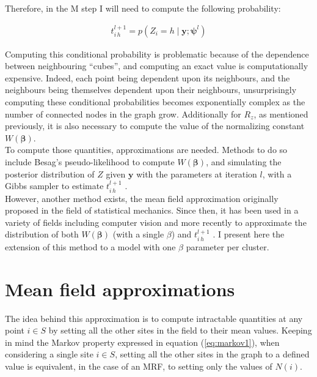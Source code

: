 Therefore, in the M step I will need to compute the following probability:

\begin{align*}
t_{i\,h}^{l+1} = p(Z_i = h \mid \boldsymbol{y};\boldsymbol{\psi}^{l})
\end{align*}

Computing this conditional probability is problematic because of the dependence between neighbouring ``cubes'', and computing an exact value is computationally expensive. Indeed, each point being dependent upon its neighbours, and the neighbours being themselves dependent upon their neighbours, unsurprisingly computing these conditional probabilities becomes exponentially complex as the number of connected nodes in the graph grow. Additionally for $R_z$, as mentioned previously, it is also necessary to compute the value of the normalizing constant $W(\boldsymbol{\beta})$.\\

To compute those quantities, approximations are needed. Methods to do so include Besag's pseudo-likelihood \citep{Besag75} to compute $W(\boldsymbol{\beta})$, and simulating the posterior distribution of $Z$ given $\boldsymbol{y}$ with the parameters at iteration $l$, with a Gibbs sampler to estimate $t_{i\,h}^{l+1}$ \citep{Chalmond89}.\\

However, another method exists, the mean field approximation originally proposed in the field of statistical mechanics. Since then, it has been used in a variety of fields including computer vision \citep{Yuille90} and more recently to approximate the distribution of both $W(\boldsymbol{\beta})$ (with a single $\beta$) and $t_{i\,h}^{l+1}$ \citep{Zhang92}. I present here the extension of this method to a model with one $\beta$ parameter per cluster.

\section{Mean field approximations}

The idea behind this approximation is to compute intractable quantities at any point $i \in S$ by setting all the other sites in the field to their mean values. Keeping in mind the Markov property expressed in equation (\ref{eq:markov1}), when considering a single site $i \in S$, setting all the other sites in the graph to a defined value is equivalent, in the case of an MRF, to setting only the values of $N(i)$.\\

